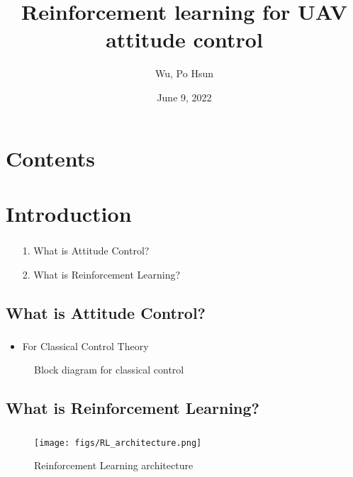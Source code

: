 \documentclass{beamer}
\date{June 9, 2022}
\title{Reinforcement learning for UAV attitude control}
\author{Wu, Po Hsun}
\institute[]{\emph{Department of Aerospace Engineering\\ Tamkang University}}
\begin{document}
    \maketitle

    \section*{Contents}
    \begin{frame}
        \frametitle{\secname}

        \tableofcontents

    \end{frame}

    \section{Introduction}
    \begin{frame}
        \frametitle{\secname}

        \begin{itemize}
            \item[1.] What is Attitude Control?
            \item[2.] What is Reinforcement Learning?
        \end{itemize}

    \end{frame}

    \subsection*{What is Attitude Control?}
    \begin{frame}
        \frametitle{\subsecname}
        \begin{itemize}
            \item For Classical Control Theory
        \end{itemize}
        \vspace{1 pt}

        \begin{figure}
            \centering
            
            \caption{Block diagram for classical control}
        \end{figure}

    \end{frame}

    \subsection*{What is Reinforcement Learning?}
    \begin{frame}
        \frametitle{\subsecname}

        \begin{figure}
            \centering
            \texttt{[image: figs/RL\_architecture.png]}
            \caption{Reinforcement Learning architecture\cite{Flight_Controller_Synthesis_Via_Deep_Reinforcement_Learning}}
        \end{figure}

    \end{frame}
\end{document}
